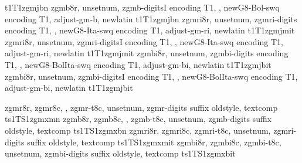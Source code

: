 {t1}{T1}{zgmj}{b}{n}{}
%
{zgmb8r,%
unsetnum,%
zgmb-digitsI encoding T1,%
\metrics {},%
newG8-Bol-swq encoding T1,%
adjust-gm-b,%
newlatin}
{t1}{T1}{zgmj}{b}{n}{}
%
{zgmri8r,%
unsetnum,%
zgmri-digits encoding T1,%
\metrics {},%
newG8-Ita-swq encoding T1,%
adjust-gm-ri,%
newlatin}
{t1}{T1}{zgmj}{m}{it}{}
%
{zgmri8r,%
unsetnum,%
zgmri-digitsI encoding T1,%
\metrics {},%
newG8-Ita-swq encoding T1,%
adjust-gm-ri,%
newlatin}
{t1}{T1}{zgmj}{m}{it}{}
%
{zgmbi8r,%
unsetnum,%
zgmbi-digits encoding T1,%
\metrics {},%
newG8-BolIta-swq encoding T1,%
adjust-gm-bi,%
newlatin}
{t1}{T1}{zgmj}{b}{it}{}
%
{zgmbi8r,%
unsetnum,%
zgmbi-digitsI encoding T1,%
\metrics {},%
newG8-BolIta-swq encoding T1,%
adjust-gm-bi,%
newlatin}
{t1}{T1}{zgmj}{b}{it}{}

%
{zgmr8r,%
zgmr8c,%
\metrics {},%
zgmr-t8c,%
unsetnum,%
zgmr-digits suffix oldstyle,%
textcomp}
{ts1}{TS1}{zgmx}{m}{n}{}
%
{zgmb8r,%
zgmb8c,%
\metrics {},%
zgmb-t8c,%
unsetnum,%
zgmb-digits suffix oldstyle,%
textcomp}
{ts1}{TS1}{zgmx}{b}{n}{}
%
{zgmri8r,%
zgmri8c,%
zgmri-t8c,%
unsetnum,%
zgmri-digits suffix oldstyle,%
textcomp}
{ts1}{TS1}{zgmx}{m}{it}{}
%
{zgmbi8r,%
zgmbi8c,%
zgmbi-t8c,%
unsetnum,%
zgmbi-digits suffix oldstyle,%
textcomp}
{ts1}{TS1}{zgmx}{b}{it}{}

